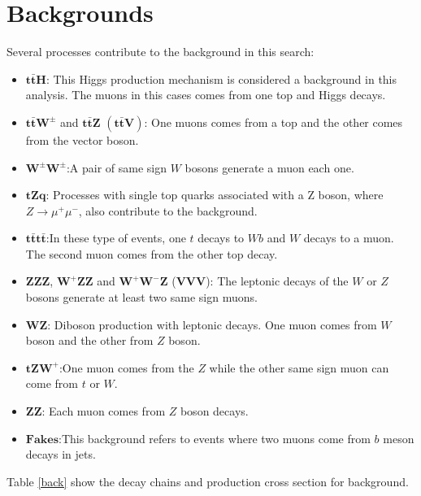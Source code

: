 \section{Backgrounds}
Several processes contribute to the background in this search:
\begin{itemize}
		\item $\bm{t\bar{t}H}$: This Higgs  production mechanism is considered a background in this analysis. The muons in this cases comes from one top and Higgs decays. 
		\item $\bm{t\bar{t}W^{\pm}}$ and $\bm{t\bar{t}Z}$ $\bm{(t\bar{t}V)}$: One muons comes from a top and the other comes from the vector boson.
		\item $\bm{W^{\pm}W^{\pm}}$:A pair of same sign $W$ bosons generate a muon each one.
		\item $\bm{tZq}$: Processes with single top quarks associated  with a Z boson, where $Z\rightarrow \mu^+ \mu^-$, also contribute to the background.
	\item $\bm{t\bar{t}t\bar{t}}$:In these type of events, one $t$ decays to $Wb$ and $W$ decays to a muon. The second muon comes from the other top decay.
		\item $\bm{ZZZ}$, $\bm{W^{+}ZZ}$ and $\bm{W^{+}W^{-}Z}$ ($\bm{VVV}$): The leptonic decays of the $W$ or $Z$ bosons generate at least two same sign muons.
	\item $\bm{WZ}$: Diboson production with leptonic decays. One muon comes from $W$ boson and the other from $Z$ boson.
	\item $\bm{tZW^{+}}$:One muon comes from the $Z$ while the other same sign muon can come from $t$ or $W$. 
	\item $\bm{ZZ}$: Each muon comes from $Z$ boson decays.
	\item $\bm{Fakes}$:This background refers to events where two muons come from  $b$ meson decays in jets.
\end{itemize}
Table \ref{back} show the decay chains and production cross section for background. 
